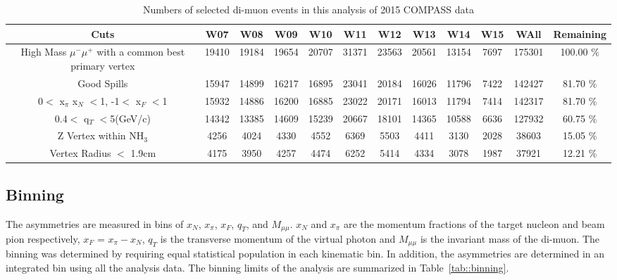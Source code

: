 \begin{table}[h!t]
  \begin{adjustwidth}{-2cm}{}
    \begin{tabular}{ |c|c|c|c|c|c|c|c|c|c|c|c| }
      \hline \textbf{Cuts}& \textbf{W07}& \textbf{W08}& \textbf{W09}&
      \textbf{W10}& \textbf{W11}& \textbf{W12}& \textbf{W13}& \textbf{W14}&
      \textbf{W15} & \textbf{WAll} & \textbf{Remaining} \\ \hline

      \multirow{2}{13em}{High Mass $\mu^-\mu^+$ with a common best primary
        vertex}& 19410& 19184& 19654& 20707& 31371& 23563& 20561& 13154& 7697&
      175301& 100.00 \% \\ & & & & & & & & & & & \\ \hline
      
      Good Spills& 15947& 14899& 16217& 16895& 23041& 20184& 16026& 11796& 7422&
      142427& 81.70 \% \\ \hline

      0$<$ x$_{\pi}$ x$_N$ $<$1, -1$<$ x$_F$ $<$1& 15932& 14886& 16200& 16885&
      23022& 20171& 16013& 11794& 7414& 142317& 81.70 \% \\ \hline

      0.4$<$ q$_T$ $<$5(GeV/c)& 14342& 13385& 14609& 15239& 20667& 18101& 14365&
      10588& 6636& 127932& 60.75 \% \\ \hline

      Z Vertex within NH$_3$& 4256& 4024& 4330& 4552& 6369& 5503& 4411& 3130&
      2028& 38603& 15.05 \% \\ \hline

      Vertex Radius $<$ 1.9cm& 4175& 3950& 4257& 4474& 6252& 5414& 4334& 3078&
      1987& 37921& 12.21 \% \\ \hline
      
    \end{tabular}
    \caption{Numbers of selected di-muon events in this analysis of 2015 COMPASS
      data}
    \label{tab::EventTable}
  \end{adjustwidth}
\end{table}

\subsection{Binning}
The asymmetries are measured in bins of $x_N$, $x_{\pi}$, $x_F$,
$q_T$, and $M_{\mu\mu}$. $x_N$ and $x_{\pi}$ are the momentum
fractions of the target nucleon and beam pion respectively, $x_F$ =
$x_{\pi} - x_N$, $q_T$ is the transverse momentum of the virtual
photon and $M_{\mu\mu}$ is the invariant mass of the di-muon.  The binning was
determined by requiring equal statistical population in each kinematic bin.  In
addition, the asymmetries are determined in an integrated bin using all the
analysis data.  The binning limits of the analysis are summarized in
Table~\ref{tab::binning}.

